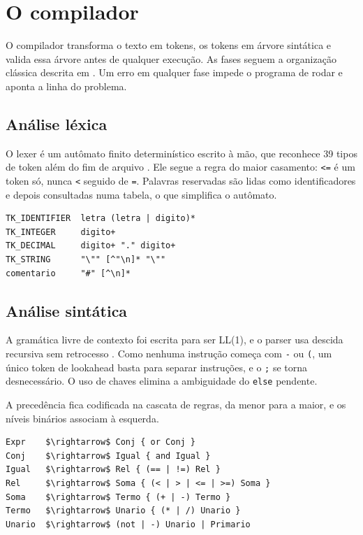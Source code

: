 \documentclass[11pt,a4paper]{article}
\newcommand{\cod}[1]{\texttt{#1}}
\begin{document}
\section{O compilador}\label{sec:compilador}

O compilador transforma o texto em tokens, os tokens em árvore sintática e valida essa árvore antes de qualquer execução. As fases seguem a organização clássica descrita em \cite{aho}. Um erro em qualquer fase impede o programa de rodar e aponta a linha do problema.

\subsection{Análise léxica}

O lexer é um autômato finito determinístico escrito à mão, que reconhece 39 tipos de token além do fim de arquivo \cite{hopcroft}. Ele segue a regra do maior casamento: \cod{<=} é um token só, nunca \cod{<} seguido de \cod{=}. Palavras reservadas são lidas como identificadores e depois consultadas numa tabela, o que simplifica o autômato.

\begin{lstlisting}[caption={Expressões regulares dos principais tokens.},label={lst:tokens}]
TK_IDENTIFIER  letra (letra | digito)*
TK_INTEGER     digito+
TK_DECIMAL     digito+ "." digito+
TK_STRING      "\"" [^"\n]* "\""
comentario     "#" [^\n]*
\end{lstlisting}

\subsection{Análise sintática}

A gramática livre de contexto foi escrita para ser LL(1), e o parser usa descida recursiva sem retrocesso \cite{aho,lewis}. Como nenhuma instrução começa com \cod{-} ou \cod{(}, um único token de lookahead basta para separar instruções, e o \cod{;} se torna desnecessário. O uso de chaves elimina a ambiguidade do \cod{else} pendente.

A precedência fica codificada na cascata de regras, da menor para a maior, e os níveis binários associam à esquerda.

\begin{lstlisting}[mathescape=true,caption={Cascata de precedência das expressões.},label={lst:gramatica}]
Expr    $\rightarrow$ Conj { or Conj }
Conj    $\rightarrow$ Igual { and Igual }
Igual   $\rightarrow$ Rel { (== | !=) Rel }
Rel     $\rightarrow$ Soma { (< | > | <= | >=) Soma }
Soma    $\rightarrow$ Termo { (+ | -) Termo }
Termo   $\rightarrow$ Unario { (* | /) Unario }
Unario  $\rightarrow$ (not | -) Unario | Primario
\end{lstlisting}
\end{document}
